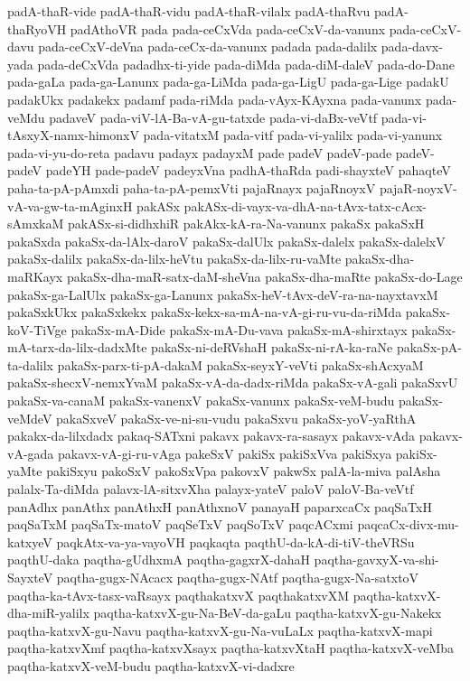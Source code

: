 {padA-thaR-vide
padA-thaR-vidu
padA-thaR-vilalx
padA-thaRvu
padA-thaRyoVH
padAthoVR
pada
pada-ceCxVda
pada-ceCxV-da-vanunx
pada-ceCxV-davu
pada-ceCxV-deVna
pada-ceCx-da-vanunx
padada
pada-dalilx
pada-davx-yada
pada-deCxVda
padadhx-ti-yide
pada-diMda
pada-diM-daleV
pada-do-Dane
pada-gaLa
pada-ga-Lanunx
pada-ga-LiMda
pada-ga-LigU
pada-ga-Lige
padakU
padakUkx
padakekx
padamf
pada-riMda
pada-vAyx-KAyxna
pada-vanunx
pada-veMdu
padaveV
pada-viV-lA-Ba-vA-gu-tatxde
pada-vi-daBx-veVtf
pada-vi-tAsxyX-namx-himonxV
pada-vitatxM
pada-vitf
pada-vi-yalilx
pada-vi-yanunx
pada-vi-yu-do-reta
padavu
padayx
padayxM
pade
padeV
padeV-pade
padeV-padeV
padeYH
pade-padeV
padeyxVna
padhA-thaRda
padi-shayxteV
pahaqteV
paha-ta-pA-pAmxdi
paha-ta-pA-pemxVti
pajaRnayx
pajaRnoyxV
pajaR-noyxV-vA-va-gw-ta-mAginxH
pakASx
pakASx-di-vayx-va-dhA-na-tAvx-tatx-cAcx-sAmxkaM
pakASx-si-didhxhiR
pakAkx-kA-ra-Na-vanunx
pakaSx
pakaSxH
pakaSxda
pakaSx-da-lAlx-daroV
pakaSx-dalUlx
pakaSx-dalelx
pakaSx-dalelxV
pakaSx-dalilx
pakaSx-da-lilx-heVtu
pakaSx-da-lilx-ru-vaMte
pakaSx-dha-maRKayx
pakaSx-dha-maR-satx-daM-sheVna
pakaSx-dha-maRte
pakaSx-do-Lage
pakaSx-ga-LalUlx
pakaSx-ga-Lanunx
pakaSx-heV-tAvx-deV-ra-na-nayxtavxM
pakaSxkUkx
pakaSxkekx
pakaSx-kekx-sa-mA-na-vA-gi-ru-vu-da-riMda
pakaSx-koV-TiVge
pakaSx-mA-Dide
pakaSx-mA-Du-vava
pakaSx-mA-shirxtayx
pakaSx-mA-tarx-da-lilx-dadxMte
pakaSx-ni-deRVshaH
pakaSx-ni-rA-ka-raNe
pakaSx-pA-ta-dalilx
pakaSx-parx-ti-pA-dakaM
pakaSx-seyxY-veVti
pakaSx-shAcxyaM
pakaSx-shecxV-nemxYvaM
pakaSx-vA-da-dadx-riMda
pakaSx-vA-gali
pakaSxvU
pakaSx-va-canaM
pakaSx-vanenxV
pakaSx-vanunx
pakaSx-veM-budu
pakaSx-veMdeV
pakaSxveV
pakaSx-ve-ni-su-vudu
pakaSxvu
pakaSx-yoV-yaRthA
pakakx-da-lilxdadx
pakaq-SATxni
pakavx
pakavx-ra-sasayx
pakavx-vAda
pakavx-vA-gada
pakavx-vA-gi-ru-vAga
pakeSxV
pakiSx
pakiSxVva
pakiSxya
pakiSx-yaMte
pakiSxyu
pakoSxV
pakoSxVpa
pakovxV
pakwSx
palA-la-miva
palAsha
palalx-Ta-diMda
palavx-lA-sitxvXha
palayx-yateV
paloV
paloV-Ba-veVtf
panAdhx
panAthx
panAthxH
panAthxnoV
panayaH
paparxcaCx
paqSaTxH
paqSaTxM
paqSaTx-matoV
paqSeTxV
paqSoTxV
paqcACxmi
paqcaCx-divx-mu-katxyeV
paqkAtx-va-ya-vayoVH
paqkaqta
paqthU-da-kA-di-tiV-theVRSu
paqthU-daka
paqtha-gUdhxmA
paqtha-gagxrX-dahaH
paqtha-gavxyX-va-shi-SayxteV
paqtha-gugx-NAcacx
paqtha-gugx-NAtf
paqtha-gugx-Na-satxtoV
paqtha-ka-tAvx-tasx-vaRsayx
paqthakatxvX
paqthakatxvXM
paqtha-katxvX-dha-miR-yalilx
paqtha-katxvX-gu-Na-BeV-da-gaLu
paqtha-katxvX-gu-Nakekx
paqtha-katxvX-gu-Navu
paqtha-katxvX-gu-Na-vuLaLx
paqtha-katxvX-mapi
paqtha-katxvXmf
paqtha-katxvXsayx
paqtha-katxvXtaH
paqtha-katxvX-veMba
paqtha-katxvX-veM-budu
paqtha-katxvX-vi-dadxre
}
